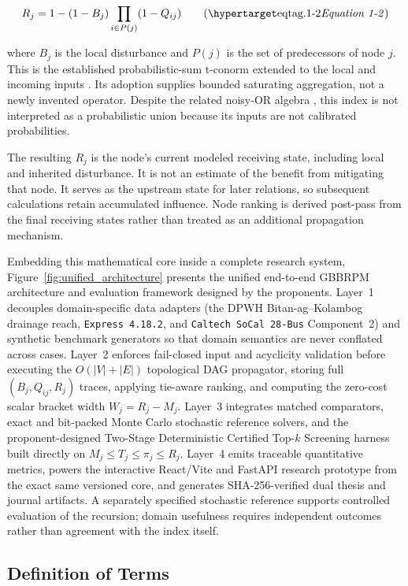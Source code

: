 \[R_j=1-(1-B_j)\prod_{i\in P(j)}(1-Q_{ij})\eqtag{1-2}\]

where $B_j$ is the local disturbance and $P(j)$ is the set of predecessors of
node $j$. This is the established probabilistic-sum t-conorm extended
to the local and incoming inputs \citep{klement2004}. Its adoption supplies
bounded saturating aggregation, not a newly invented operator. Despite
the related noisy-OR algebra \citep{fallet2012}, this index is not
interpreted as a probabilistic union because its inputs are not calibrated
probabilities.

The resulting $R_j$ is the node's current modeled receiving state, including
local and inherited disturbance. It is not an estimate of the benefit from
mitigating that node. It serves as the upstream state for later relations,
so subsequent calculations retain accumulated influence. Node ranking is
derived post-pass from the final receiving states rather than treated as an
additional propagation mechanism.

Embedding this mathematical core inside a complete research system,
Figure~\ref{fig:unified_architecture} presents the unified end-to-end GBBRPM
architecture and evaluation framework designed by the proponents. Layer~1
decouples domain-specific data adapters (the DPWH Bitan-ag--Kolambog drainage
reach, \texttt{Express 4.18.2}, and \texttt{Caltech SoCal 28-Bus}
Component~2) and synthetic benchmark generators so that domain semantics are
never conflated across cases. Layer~2 enforces fail-closed input and
acyclicity validation before executing the $O(|V|+|E|)$ topological DAG
propagator, storing full $(B_j, Q_{ij}, R_j)$ traces, applying tie-aware
ranking, and computing the zero-cost scalar bracket width $W_j = R_j - M_j$.
Layer~3 integrates matched comparators, exact and bit-packed Monte Carlo
stochastic reference solvers, and the proponent-designed Two-Stage
Deterministic Certified Top-$k$ Screening harness built directly on
$M_j \le T_j \le \pi_j \le R_j$. Layer~4 emits traceable quantitative metrics,
powers the interactive React/Vite and FastAPI research prototype from the
exact same versioned core, and generates SHA-256-verified dual thesis and
journal artifacts. A separately specified stochastic reference supports
controlled evaluation of the recursion; domain usefulness requires
independent outcomes rather than agreement with the index itself.



\subsection{Definition of Terms}\label{definition-of-terms}
 
